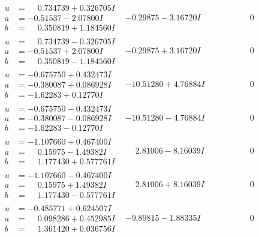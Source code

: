 \documentclass[1p]{elsarticle_modified}
\theoremstyle{definition}
\begin{document}
$$\begin{array}{c|c|c}
\begin{aligned}
u &= \phantom{-}0.734739 + 0.326705 I \\
a &= -0.51537 - 2.07800 I \\
b &= \phantom{-}0.350819 + 1.184560 I\end{aligned}
 & -0.29875 - 3.16720 I & \phantom{-0.000000 } 0 \\ \hline\begin{aligned}
u &= \phantom{-}0.734739 - 0.326705 I \\
a &= -0.51537 + 2.07800 I \\
b &= \phantom{-}0.350819 - 1.184560 I\end{aligned}
 & -0.29875 + 3.16720 I & \phantom{-0.000000 } 0 \\ \hline\begin{aligned}
u &= -0.675750 + 0.432473 I \\
a &= -0.380087 + 0.086928 I \\
b &= -1.62283 + 0.12770 I\end{aligned}
 & -10.51280 + 4.76884 I & \phantom{-0.000000 } 0 \\ \hline\begin{aligned}
u &= -0.675750 - 0.432473 I \\
a &= -0.380087 - 0.086928 I \\
b &= -1.62283 - 0.12770 I\end{aligned}
 & -10.51280 - 4.76884 I & \phantom{-0.000000 } 0 \\ \hline\begin{aligned}
u &= -1.107660 + 0.467400 I \\
a &= \phantom{-}0.15975 - 1.49382 I \\
b &= \phantom{-}1.177430 + 0.577761 I\end{aligned}
 & \phantom{-}2.81006 - 8.16039 I & \phantom{-0.000000 } 0 \\ \hline\begin{aligned}
u &= -1.107660 - 0.467400 I \\
a &= \phantom{-}0.15975 + 1.49382 I \\
b &= \phantom{-}1.177430 - 0.577761 I\end{aligned}
 & \phantom{-}2.81006 + 8.16039 I & \phantom{-0.000000 } 0 \\ \hline\begin{aligned}
u &= -0.485771 + 0.624507 I \\
a &= \phantom{-}0.098286 + 0.452985 I \\
b &= \phantom{-}1.361420 + 0.036756 I\end{aligned}
 & -9.89815 - 1.88335 I & \phantom{-0.000000 } 0 \\ \hline\begin{aligned}

\end{aligned}
\end{array}$$
\end{document}
